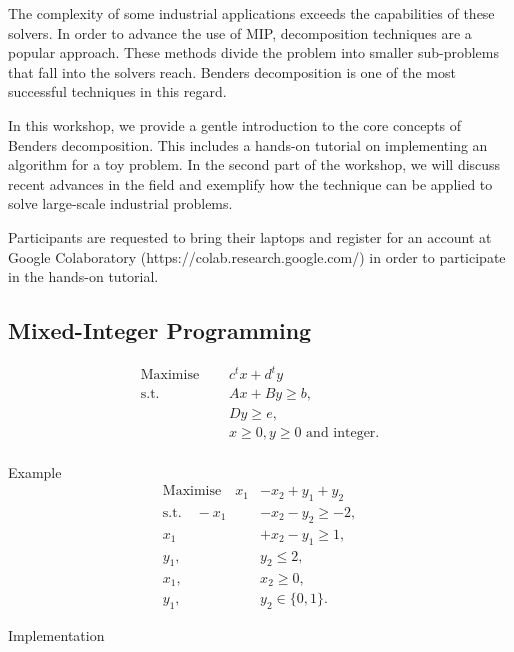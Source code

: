 The complexity of some industrial applications exceeds the capabilities of these solvers. In order to advance the use of MIP, decomposition techniques are a popular approach. These methods divide the problem into smaller sub-problems that fall into the solvers reach. Benders decomposition is one of the most successful techniques in this regard.

In this workshop, we provide a gentle introduction to the core concepts of Benders decomposition. This includes a hands-on tutorial on implementing an algorithm for a toy problem. In the second part of the workshop, we will discuss recent advances in the field and exemplify how the technique can be applied to solve large-scale industrial problems.

Participants are requested to bring their laptops and register for an account at Google Colaboratory (https://colab.research.google.com/) in order to participate in the hands-on tutorial.

\vfill

\newpage





\subsection*{Mixed-Integer Programming}

\vfill

\begin{align*}
\textrm{Maximise } \quad &  c^tx + d^ty \\
\textrm{s.t.} \quad & Ax + By \geq b, \\
& Dy \geq e, \\
& x {\geq 0},  y {\geq 0} \textrm{ and integer}.\\
\end{align*}\vfill
\begin{bclogo}[logo=\bccrayon]{\small Example } \small
\vspace{-0.5cm}
\begin{align*}
\textrm{Maximise} \quad   x_1 &- x_2 + y_1 + y_2 \\
\textrm{s.t.} \quad  -x_1 & - x_2 - y_2 \geq -2, \\
 x_1  &+ x_2 - y_1 \geq 1, \\
y_1, & y_2 \leq 2, \\
 x_1, & x_2 \geq 0, \\
 y_1, & y_2 \in \{0,1\}.
\end{align*}
\end{bclogo}
\vfill
\begin{bclogo}[logo=\bcinfo, barre=none ]{\small Implementation}
\vspace{0.2cm}

\end{bclogo}
\vfill


